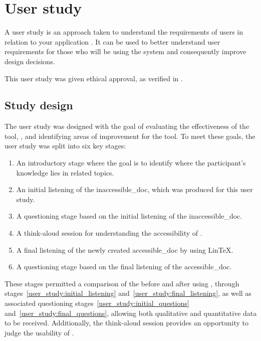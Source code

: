 \section{\nmu User \nmu study}\label{user_study}
A user study is an approach taken to understand the requirements of users in relation to your application \parencite{user_study_definition}. It can be used to better understand user requirements for those who will be using the system and consequently improve design decisions.

This user study was given ethical approval, as verified in .

\subsection{Study design}
The user study was designed with the goal of evaluating the effectiveness of the tool, \lintex , and identifying areas of improvement for the tool. To meet these goals, the user study was split into six key stages:

\begin{enumerate}
    \item An introductory stage where the goal is to identify where the participant's knowledge lies in related topics.\label{user_study:intro_questions}
    \item An initial listening of the \gls{inaccessible_doc}, which was produced for this user study.\label{user_study:initial_listening}
    \item A questioning stage based on the initial listening of the \gls{inaccessible_doc}.\label{user_study:initial_questions}
    \item A think-aloud session for understanding the accessibility of \lintex.\label{user_study:using_lintex}
    \item A final listening of the newly created \gls{accessible_doc} by using LinTeX.\label{user_study:final_listening}
    \item A questioning stage based on the final listening of the \gls{accessible_doc}.\label{user_study:final_questions}
\end{enumerate}
These stages permitted a comparison of the before and after using \lintex , through stages~\ref{user_study:initial_listening} and~\ref{user_study:final_listening}, as well as associated questioning stages~\ref{user_study:initial_questions} and~\ref{user_study:final_questions}, allowing both qualitative and quantitative data to be received. Additionally, the think-aloud session provides an opportunity to judge the usability of \lintex.

